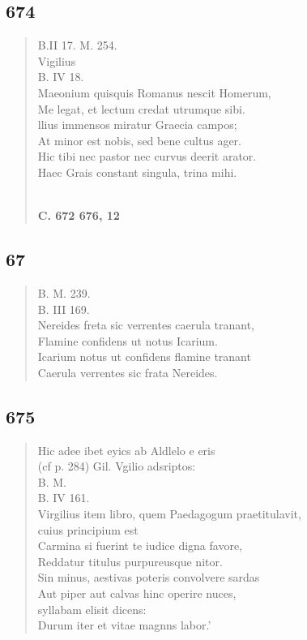 \documentclass[11pt, a4paper]{report}
\begin{document}
            \subsection*{674}
      \begin{verse}
      B.II 17. M. 254. \\ Vigilius \\ B. IV 18. \\ Maeonium quisquis Romanus nescit Homerum, \\ Me legat, et lectum credat utrumque sibi. \\ llius immensos miratur Graecia campos; \\ At minor est nobis, sed bene cultus ager. \\ Hic tibi nec pastor nec curvus deerit arator. \\ Haec Grais constant singula, trina mihi. \\ 
        ﻿\pagebreak 
    \begin{center} \textbf{C. 672 676, 12} \end{center} \marginpar{[151]} 
      \end{verse}
  
            \subsection*{67}
      \begin{verse}
      B. M. 239. \\ B. III 169. \\ Nereides freta sic verrentes caerula tranant, \\ Flamine confidens ut notus Icarium. \\ Icarium notus ut confidens flamine tranant \\ Caerula verrentes sic frata Nereides. \\ 
      \end{verse}
  
            \subsection*{675}
      \begin{verse}
      Hic adee ibet eyics ab Aldlelo e eris \\ (cf p. 284) Gil. Vgilio adsriptos: \\ B. M. \\ B. IV 161. \\ Virgilius item libro, quem Paedagogum praetitulavit, \\ cuius principium est \\ Carmina si fuerint te iudice digna favore, \\ Reddatur titulus purpureusque nitor. \\ Sin minus, aestivas poteris convolvere sardas \\ Aut piper aut calvas hinc operire nuces, \\ syllabam elisit dicens: \\ Durum iter et vitae magnns labor.’ \\ 
      \end{verse}
  
\end{document}

